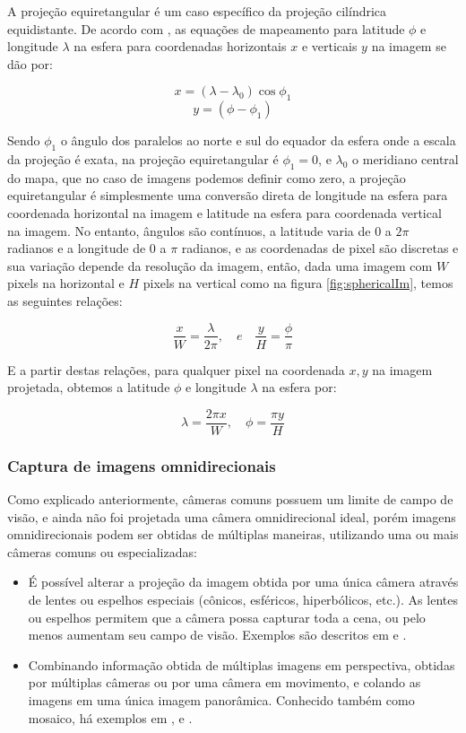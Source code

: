 \documentclass[cic,tc]{iiufrgs}
\begin{document}
A projeção equiretangular é um caso específico da projeção cilíndrica equidistante. De acordo com \citet{equiretangularProjection}, as equações de mapeamento para latitude $\phi$ e longitude $\lambda$ na esfera para coordenadas horizontais $x$ e verticais $y$ na imagem se dão por:

$$ x = (\lambda - \lambda_0)\cos{\phi_1} $$
$$ y = (\phi - \phi_1)$$

Sendo $\phi_1$ o ângulo dos paralelos ao norte e sul do equador da esfera onde a escala da projeção é exata, na projeção equiretangular é $\phi_1 = 0$, e $\lambda_0$ o meridiano central do mapa, que no caso de imagens podemos definir como zero, a projeção equiretangular é simplesmente uma conversão direta de longitude na esfera para coordenada horizontal na imagem e latitude na esfera para coordenada vertical na imagem. No entanto, ângulos são contínuos, a latitude varia de 0 a $2\pi$ radianos e a longitude de 0 a $\pi$ radianos, e as coordenadas de pixel são discretas e sua variação depende da resolução da imagem, então, dada uma imagem com $W$ pixels na horizontal e $H$ pixels na vertical como na figura \ref{fig:sphericalIm}, temos as seguintes relações:

$$ \frac{x}{W} = \frac{\lambda}{2\pi}, \hspace{1em} e \hspace{1em}  \frac{y}{H} = \frac{\phi}{\pi}$$

E a partir destas relações, para qualquer pixel na coordenada $x,y$ na imagem projetada, obtemos a latitude $\phi$ e longitude $\lambda$ na esfera por:

$$ \lambda = \frac{2\pi x}{W}, \hspace{1em}  \phi = \frac{\pi y}{H}$$

\subsubsection{Captura de imagens omnidirecionais}

Como explicado anteriormente, câmeras comuns possuem um limite de campo de visão, e ainda não foi projetada uma câmera omnidirecional ideal, porém imagens omnidirecionais podem ser obtidas de múltiplas maneiras, utilizando uma ou mais câmeras comuns ou especializadas:
\begin{itemize}
\item É possível alterar a projeção da imagem obtida por uma única câmera através de lentes ou espelhos especiais (cônicos, esféricos, hiperbólicos, etc.). As lentes ou espelhos permitem que a câmera possa capturar toda a cena, ou pelo menos aumentam seu campo de visão. Exemplos são descritos em \citet{omniSingleCam1997} e \citet{omniSingleCam1998}.
\item Combinando informação obtida de múltiplas imagens em perspectiva, obtidas por múltiplas câmeras ou por uma câmera em movimento, e colando as imagens em uma única imagem panorâmica. Conhecido também como mosaico, há exemplos em \citet{omniMultiCam1994}, \citet{omniMultiCam1996} e \citet{omniMultiCam1997}.
\end{itemize}
\end{document}
